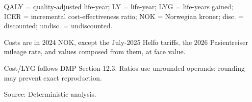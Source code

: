 \begin{table}[H]
{\begin{threeparttable}
\begin{tabular}[t]
\bottomrule
\end{tabular}
\begin{tablenotes}
\item QALY = quality-adjusted life-year; LY = life-year; LYG = life-years gained; ICER = incremental cost-effectiveness ratio; NOK = Norwegian kroner; disc. = discounted; undisc. = undiscounted.
\item Costs are in 2024 NOK, except the July-2025 Helfo tariffs, the 2026 Pasientreiser mileage rate, and values composed from them, at face value.
\item Cost/LYG follows DMP Section 12.3. Ratios use unrounded operands; rounding may prevent exact reproduction.
\item Source: Deterministic analysis.
\end{tablenotes}
\end{threeparttable}
}
\end{table}
